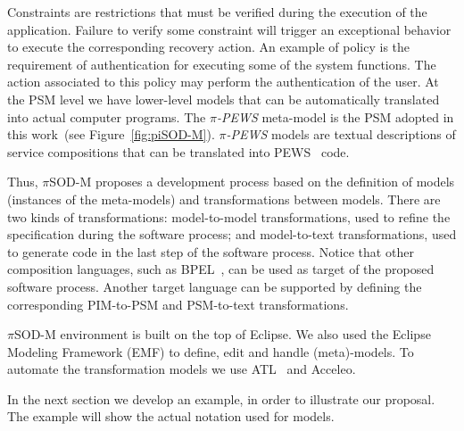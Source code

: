 Constraints are restrictions that must be verified during the execution of the application. 
Failure to verify some constraint will trigger an exceptional behavior to execute the corresponding recovery action.
An example of policy is the requirement of authentication for executing some of the system functions. 
The action associated to this policy may perform the authentication of the user.
%
At the PSM level we have lower-level models that can be automatically translated into actual computer programs.
The \textit{$\pi$-PEWS} meta-model is the PSM adopted in this work~(see Figure~\ref{fig:piSOD-M}).
\textit{$\pi$-PEWS} models are textual descriptions of service compositions that can be translated into PEWS~\cite{BHM06} %
code.





%
Thus, $\pi$SOD-M proposes a development process based on the definition of models
(instances of the meta-models) and transformations between models.
There are two kinds of transformations:
model-to-model transformations, used to refine the specification during the software process; and
model-to-text transformations, used   to generate code in the last step of the software process.
Notice that other composition languages, such as BPEL~\cite{bpel03}, can be used as target of the proposed software process. Another target language can be supported by defining the corresponding PIM-to-PSM and PSM-to-text transformations.



$\pi$SOD-M environment is built on the top of Eclipse. 
We also used the Eclipse Modeling Framework (EMF) to define, edit and handle
(meta)-models. 
To automate the transformation models we use ATL~\cite{atl_manual} and Acceleo.

In the next section we develop an example, in order to illustrate our proposal.
The example will show the actual notation used for models. 





